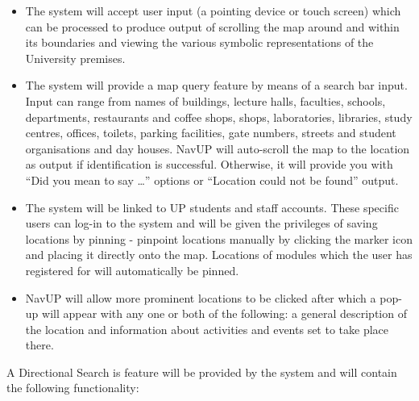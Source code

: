 \documentclass[runningheads,a4paper]{llncs}
\begin{document}
\begin{itemize}

\item The system will accept user input (a pointing device or touch screen) which can be processed to produce output of scrolling the map around and within its boundaries and viewing the various symbolic representations of the University premises.

\item The system will provide a map query feature by means of a search bar input. Input can range from names of buildings, lecture halls, faculties, schools, departments, restaurants and coffee shops, shops, laboratories, libraries, study centres, offices, toilets,  parking facilities, gate numbers, streets and student organisations and day houses. NavUP will auto-scroll the map to the location as output if identification is successful. Otherwise, it will provide you with “Did you mean to say …” options or “Location could not be found” output.

\item The system will be linked to UP students and staff accounts. These specific users can log-in to the system and will be given the privileges of saving locations by pinning - pinpoint locations manually by clicking the marker icon and placing it directly onto the map. Locations of modules which the user has registered for will automatically be pinned.

\item NavUP will allow more prominent locations to be clicked after which a pop-up will appear with any one or both of the following: a general description of the location and information about activities and events set to take place there.

\end{itemize}

\let\labelitemi\labelitemii

A Directional Search is feature will be provided by the system and will contain the following functionality:
\end{document}

